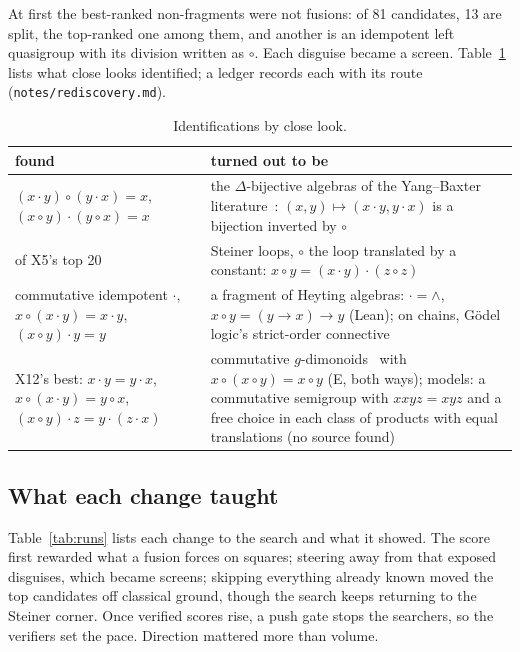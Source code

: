 \documentclass[11pt]{article}
\newcommand{\op}{\cdot}
\newcommand{\cop}{\circ}
\begin{document}
At first the best-ranked non-fragments were not fusions: of 81 candidates, 13 are split, the top-ranked one among
them, and another is an idempotent left quasigroup with its division written as $\cop$. Each disguise became a
screen. Table~\ref{tab:ident} lists what close looks identified; a ledger records each with its route
(\texttt{notes/rediscovery.md}).

\begin{table}[!htb]\centering\small
\begin{tabular}{@{}>{\raggedright\arraybackslash}p{}>{\raggedright\arraybackslash}p{}@{}}\toprule
found & turned out to be \\\midrule
$(x\op y)\cop(y\op x)=x$, $(x\cop y)\op(y\cop x)=x$ & the $\Delta$-bijective algebras of the Yang--Baxter
  literature~\cite{rump2005,bonatto2021}: $(x,y)\mapsto(x\op y,y\op x)$ is a bijection inverted by $\cop$ \\
18 of X5's top 20 & Steiner loops, $\cop$ the loop translated by a constant: $x\cop y=(x\op y)\op(z\cop z)$ \\
commutative idempotent $\op$, $x\cop(x\op y)=x\op y$, $(x\cop y)\op y=y$ & a fragment of Heyting algebras:
  $\op=\wedge$, $x\cop y=(y\to x)\to y$ (Lean); on chains, G\"odel logic's strict-order connective~\cite{bcz2000} \\
X12's best: $x\op y=y\op x$, $x\cop(x\op y)=y\cop x$, $(x\cop y)\op z=y\op(z\op x)$ & commutative
  $g$-dimonoids~\cite{movsisyan2014,zhuchok2015,gavrylkiv2026} with $x\cop(x\cop y)=x\cop y$ (E, both ways); models:
  a commutative semigroup with $xxyz=xyz$ and a free choice in each class of products with equal translations (no
  source found) \\
\bottomrule\end{tabular}
\caption{Identifications by close look.}\label{tab:ident}
\end{table}

\subsection{What each change taught}
Table~\ref{tab:runs} lists each change to the search and what it showed. The score first rewarded what a fusion
forces on squares; steering away from that exposed disguises, which became screens; skipping everything already known
moved the top candidates off classical ground, though the search keeps returning to the Steiner corner. Once verified
scores rise, a push gate stops the searchers, so the verifiers set the pace. Direction mattered more than volume.
\end{document}
